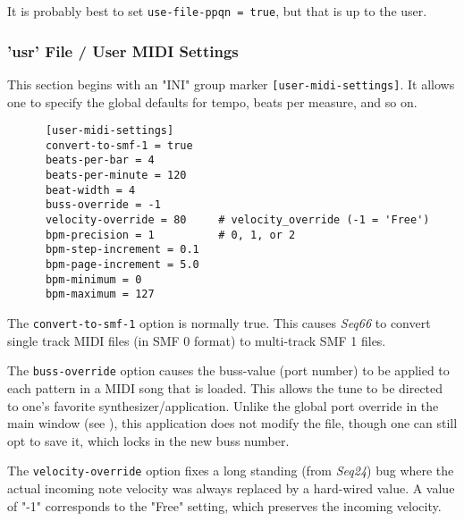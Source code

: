    It is probably best to set \texttt{use-file-ppqn = true}, but that is
   up to the user.

\subsubsection{'usr' File / User MIDI Settings}
\label{subsubsec:usr_file_user_midi_settings}

   This section begins with an
   "INI" group marker \texttt{[user-midi-settings]}.
   It allows one to specify the
   global defaults for tempo, beats per measure, and so on.

   \begin{verbatim}
      [user-midi-settings]
      convert-to-smf-1 = true
      beats-per-bar = 4
      beats-per-minute = 120
      beat-width = 4
      buss-override = -1
      velocity-override = 80     # velocity_override (-1 = 'Free')
      bpm-precision = 1          # 0, 1, or 2
      bpm-step-increment = 0.1
      bpm-page-increment = 5.0
      bpm-minimum = 0
      bpm-maximum = 127
   \end{verbatim}

   The \texttt{convert-to-smf-1} option is normally true. This causes
   \textsl{Seq66} to convert single track MIDI files (in SMF 0 format) to
   multi-track SMF 1 files.

   The \texttt{buss-override} option causes the buss-value (port number) to be
   applied to each pattern in a MIDI song that is loaded.  This allows the tune
   to be directed to one's favorite synthesizer/application.
   Unlike the global port override in the main window
   (see ),
   this application does not modify the file, though one can still opt to save
   it, which locks in the new buss number.

   The \texttt{velocity-override} option fixes a long standing (from
   \textsl{Seq24}) bug where the actual incoming note velocity was always
   replaced by a hard-wired value.  A value of "-1" corresponds to the "Free"
   setting, which preserves the incoming velocity.

